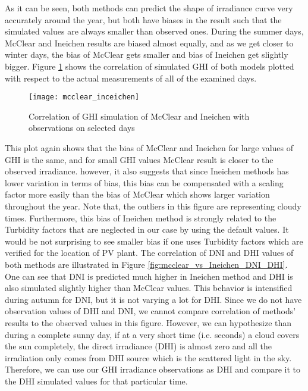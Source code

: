 As it can be seen, both methods can predict the shape of irradiance curve very accurately around the year, but both have biases in the result such that the simulated values are always smaller than observed ones. During the summer days, McClear and  Ineichen results are biased almost equally, and as we get closer to winter days, the bias of McClear gets smaller and bias of Ineichen get slightly bigger. 
Figure \ref{fig:mcclear_to_Ineichen} shows the correlation of simulated GHI of both models plotted with respect to the actual measurements of all of the examined days.

\begin{figure}[h]
\caption{Correlation of GHI simulation of McClear and Ineichen with observations on selected days}
\label{fig:mcclear_to_Ineichen}
\texttt{[image: mcclear\_inceichen]}
\centering
\end{figure}

This plot again shows that the bias of McClear and Ineichen for large values of GHI is the same, and for small GHI values McClear result is closer to the observed irradiance. however, it also suggests that since Ineichen methods has lower variation in terms of bias, this bias can be compensated with a scaling factor more easily than the bias of McClear which shows larger variation throughout the year. Note that, the outliers in this figure are representing cloudy times. Furthermore, this bias of Ineichen method is strongly related to the Turbidity factors that are neglected in our case by using the default values. It would be not surprising to see smaller bias if one uses Turbidity factors which are verified for the location of PV plant. The correlation of DNI and DHI values of both methods are illustrated in Figure \ref{fig:mcclear_vs_Ineichen_DNI_DHI}. One can see that DNI is predicted much higher in Ineichen method and DHI is also simulated slightly higher than McClear values. This behavior is intensified during autumn for DNI, but it is not varying a lot for DHI. Since we do not have observation values of DHI and DNI, we cannot compare correlation of methods' results to the observed values in this figure.  However, we can hypothesize than during a complete sunny day, if at a very short time (i.e. seconds) a cloud covers the sun completely, the direct irradiance (DHI) is almost zero and all the irradiation only comes from DHI source which is the scattered light in the sky. Therefore, we can use our GHI irradiance observations as DHI and compare it to the DHI simulated values for that particular time. 


